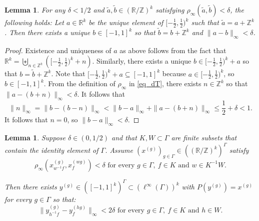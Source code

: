\documentclass[oneside,english]{amsart}
\newtheorem{lem}[thm]{Lemma}
\theoremstyle{definition}
\newcommand{\ZZ}{\mathbb{Z}}
\newcommand{\RR}{\mathbb{R}}
\newcommand{\dT}{\rho_\infty}
\begin{document}
\begin{lem}\label{lem:lift_approx}
For  any $\delta < 1/2$ and $\tilde a,\tilde b \in (\RR/\ZZ)^k$ satisfying $\rho_\infty(\tilde a,\tilde b) < \delta$, the following holds: Let   $a \in \RR^k$ be the unique
element of $[-\frac{1}{2},\frac{1}{2})^k$ such that $\tilde a = a + \ZZ^k$. Then there exists a unique $b \in [-1,1]^k$ so that $\tilde b = b + \ZZ^k$ and
$\|a - b\|_{\infty} < \delta$.
\end{lem}
\begin{proof}
Existence and uniqueness of $a$ as above follows from the fact that
$\RR^k= \biguplus_{n \in \ZZ^k}\left([-\frac{1}{2},\frac{1}{2})^k+n\right)$.
Similarly, there exists a unique $b \in [-\frac{1}{2},\frac{1}{2})^k + a$ so that
$b = \tilde b + \ZZ^k$.
Note that $[-\frac{1}{2},\frac{1}{2})^k +  a \subseteq [-1,1]^k$ because $ a \in [-\frac{1}{2},\frac{1}{2})^k$, so $b \in [-1,1]^k$.
From the definition of $\rho_\infty$ in \eqref{eq_dT},
there exists $n \in \ZZ^k$ so that $\|a - (b + n)\|_\infty < \delta$. %
It follows that
$$\|n\|_\infty =\|b -(b - n)\|_\infty < \|b- a\|_\infty + \|a- (b+n)\|_\infty \le \frac{1}{2} + \delta < 1.$$
It follows that  $n=0$, so $\|b-a\|_\infty < \delta$.
\end{proof}

\begin{lem}\label{lem:lift_compt}
Suppose $\delta \in (0,1/2)$ and that $K,W \subset \Gamma$ are finite subsets that contain the identity element of $\Gamma$. %
Assume
$(x^{(g)})_{g \in \Gamma} \in  ((\RR/\ZZ)^k)^\Gamma$ satisfy  %
\begin{equation}\label{eq:dT}
\dT (x^{(g)}_{w^{-1}f},x^{(wg)}_f)< \delta \mbox{ for every } g \in \Gamma,~ f \in K  \mbox{ and }w \in K^{-1}W.
\end{equation}


Then there exists $y^{(g)} \in ([-1,1]^k)^\Gamma \subset (\ell^\infty(\Gamma))^k$ with $P(y^{(g)})=x^{(g)}$ for every $g \in \Gamma$ so that:
\begin{equation}\label{eq:ys_compat}
\|y^{(g)}_{h^{-1}f}- y^{(hg)}_f\|_\infty < 2\delta \mbox{ for every } g \in \Gamma,~ f \in K  \mbox{ and }h \in W.
\end{equation}
\end{lem}
\end{document}
